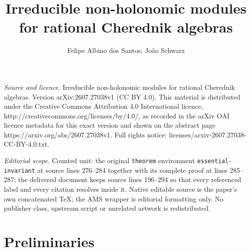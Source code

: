 \documentclass[10pt,a4paper]{amsart}
\begin{document}
\title[Irreducible non-holonomic modules for rational Cherednik alg]{Irreducible non-holonomic modules for rational Cherednik algebras}
\author{Felipe Albino dos Santos; João Schwarz}
\date{}
\maketitle
\noindent\emph{Source and licence.} Irreducible non-holonomic modules for rational Cherednik algebras. Version arXiv:2607.27038v1 (CC BY 4.0). This material is distributed under the Creative Commons Attribution 4.0 International licence, http://creativecommons.org/licenses/by/4.0/, as recorded in the arXiv OAI licence metadata for this exact version and shown on the abstract page https://arxiv.org/abs/2607.27038v1. Full rights notice: licenses/arxiv-2607.27038-CC-BY-4.0.txt.\par\smallskip
\noindent\textit{Editorial scope.} Counted unit: the original \texttt{theorem} environment \texttt{essential-invariant} at source lines 276--284 together with its complete proof at lines 285--287; the delivered document keeps source lines 196--294 so that every referenced label and every citation resolves inside it. Native editable source is the paper's own concatenated TeX; the AMS wrapper is editorial formatting only. No publisher class, upstream script or unrelated artwork is redistributed.
\section{Preliminaries}
\end{document}
